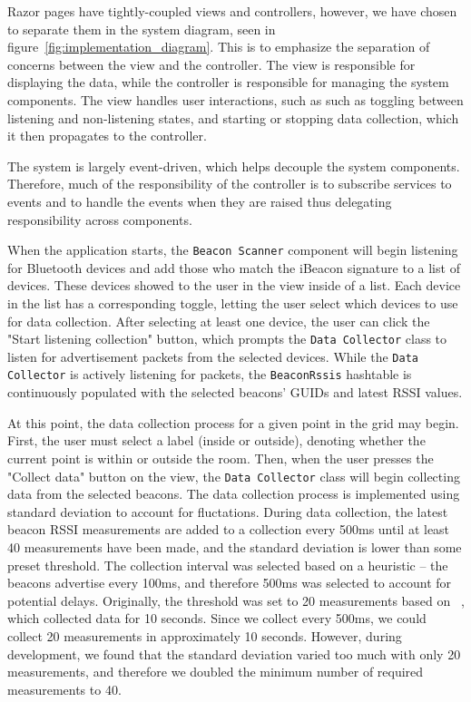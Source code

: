 Razor pages have tightly-coupled views and controllers, however, we have chosen to separate them in the system diagram, seen in figure~\ref{fig:implementation_diagram}. This is to emphasize the separation of concerns between the view and the controller. The view is responsible for displaying the data, while the controller is responsible for managing the system components. The view handles user interactions, such as such as toggling between listening and non-listening states, and starting or stopping data collection, which it then propagates to the controller.

The system is largely event-driven, which helps decouple the system components. 
Therefore, much of the responsibility of the controller is to subscribe services to events and to handle the events when they are raised thus delegating responsibility across components. 

When the application starts, the \texttt{Beacon Scanner} component will begin listening for Bluetooth devices and add those who match the iBeacon signature to a list of devices.
These devices showed to the user in the view inside of a list.
Each device in the list has a corresponding toggle, letting the user select which devices to use for data collection.
After selecting at least one device, the user can click the "Start listening collection" button, which prompts the \texttt{Data Collector} class to listen for advertisement packets from the selected devices. 
While the \texttt{Data Collector} is actively listening for packets, the \texttt{BeaconRssis} hashtable is continuously populated with the selected beacons' GUIDs and latest RSSI values.


At this point, the data collection process for a given point in the grid may begin.
First, the user must select a label (inside or outside), denoting whether the current point is within or outside the room.
Then, when the user presses the "Collect data" button on the view, the \texttt{Data Collector} class will begin collecting data from the selected beacons.
The data collection process is implemented using standard deviation to account for fluctations.
During data collection, the latest beacon RSSI measurements are added to a collection every 500ms until at least 40 measurements have been made, and the standard deviation is lower than some preset threshold.
The collection interval was selected based on a heuristic -- the beacons advertise every 100ms, and therefore 500ms was selected to account for potential delays.
Originally, the threshold was set to 20 measurements based on \citeauthor{improving_indoor_localization}~\cite{improving_indoor_localization}, which collected data for 10 seconds.
Since we collect every 500ms, we could collect 20 measurements in approximately 10 seconds. However, during development, we found that the standard deviation varied too much with only 20 measurements, and therefore we doubled the minimum number of required measurements to 40.

